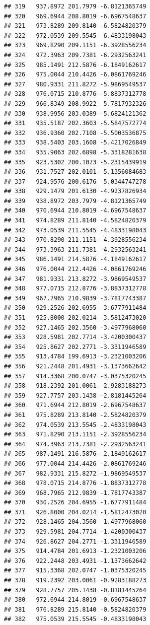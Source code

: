 \documentclass[
]{article}
\begin{document}
\begin{verbatim}
## 319   937.8972 201.7979 -6.8121365749
## 320   969.6944 208.8019 -6.6967548637
## 321   973.8289 209.8140 -6.5824820379
## 322   972.0539 209.5545 -6.4833198043
## 323   969.8290 209.1151 -6.3928556234
## 324   972.3963 209.7381 -6.2932563241
## 325   985.1491 212.5876 -6.1849162617
## 326   975.0044 210.4426 -6.0861769246
## 327   980.9331 211.8272 -5.9869549537
## 328   976.0715 210.8776 -5.8837312778
## 329   966.8349 208.9922 -5.7817932326
## 330   938.9956 203.0389 -5.6824121362
## 331   935.5187 202.3603 -5.5847572774
## 332   936.9360 202.7108 -5.5003536875
## 333   938.5403 203.1608 -5.4217026849
## 334   935.9063 202.6898 -5.3318281638
## 335   923.5302 200.1073 -5.2315439919
## 336   931.7527 202.0101 -5.1356084683
## 337   924.9576 200.6176 -5.0344747278
## 338   929.1479 201.6130 -4.9237826934
## 339   938.8972 203.7979 -4.8121365749
## 340   970.6944 210.8019 -4.6967548637
## 341   974.8289 211.8140 -4.5824820379
## 342   973.0539 211.5545 -4.4833198043
## 343   970.8290 211.1151 -4.3928556234
## 344   973.3963 211.7381 -4.2932563241
## 345   986.1491 214.5876 -4.1849162617
## 346   976.0044 212.4426 -4.0861769246
## 347   981.9331 213.8272 -3.9869549537
## 348   977.0715 212.8776 -3.8837312778
## 349   967.7965 210.9839 -3.7817743387
## 350   929.2526 202.6955 -3.6777911484
## 351   925.8000 202.0214 -3.5812473020
## 352   927.1465 202.3560 -3.4977968060
## 353   928.5981 202.7714 -3.4200300437
## 354   925.8627 202.2771 -3.3311946589
## 355   913.4784 199.6913 -3.2321003206
## 356   921.2448 201.4931 -3.1373662642
## 357   914.3368 200.0747 -3.0375320245
## 358   918.2392 201.0061 -2.9283188273
## 359   927.7757 203.1438 -2.8181445264
## 360   971.6944 212.8019 -2.6967548637
## 361   975.8289 213.8140 -2.5824820379
## 362   974.0539 213.5545 -2.4833198043
## 363   971.8290 213.1151 -2.3928556234
## 364   974.3963 213.7381 -2.2932563241
## 365   987.1491 216.5876 -2.1849162617
## 366   977.0044 214.4426 -2.0861769246
## 367   982.9331 215.8272 -1.9869549537
## 368   978.0715 214.8776 -1.8837312778
## 369   968.7965 212.9839 -1.7817743387
## 370   930.2526 204.6955 -1.6777911484
## 371   926.8000 204.0214 -1.5812473020
## 372   928.1465 204.3560 -1.4977968060
## 373   929.5981 204.7714 -1.4200300437
## 374   926.8627 204.2771 -1.3311946589
## 375   914.4784 201.6913 -1.2321003206
## 376   922.2448 203.4931 -1.1373662642
## 377   915.3368 202.0747 -1.0375320245
## 378   919.2392 203.0061 -0.9283188273
## 379   928.7757 205.1438 -0.8181445264
## 380   972.6944 214.8019 -0.6967548637
## 381   976.8289 215.8140 -0.5824820379
## 382   975.0539 215.5545 -0.4833198043

\end{verbatim}
\end{document}
